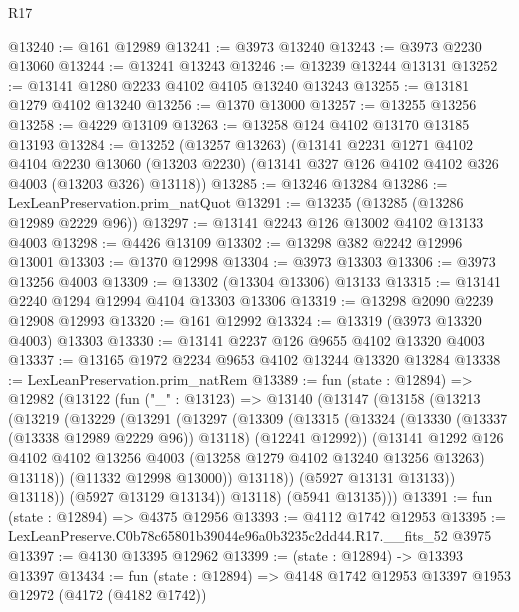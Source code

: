 \begin{lexlean}{R17}
\begin{coremodule}
@13240 := @161 @12989
@13241 := @3973 @13240
@13243 := @3973 @2230 @13060
@13244 := @13241 @13243
@13246 := @13239 @13244 @13131
@13252 := @13141 @1280 @2233 @4102 @4105 @13240 @13243
@13255 := @13181 @1279 @4102 @13240
@13256 := @1370 @13000
@13257 := @13255 @13256
@13258 := @4229 @13109
@13263 := @13258 @124 @4102 @13170 @13185 @13193
@13284 := @13252
    (@13257 @13263)
    (@13141
      @2231
      @1271
      @4102
      @4104
      @2230
      @13060
      (@13203 @2230)
      (@13141 @327 @126 @4102 @4102 @326 @4003 (@13203 @326) @13118))
@13285 := @13246 @13284
@13286 := LexLeanPreservation.prim_natQuot
@13291 := @13235 (@13285 (@13286 @12989 @2229 @96))
@13297 := @13141 @2243 @126 @13002 @4102 @13133 @4003
@13298 := @4426 @13109
@13302 := @13298 @382 @2242 @12996 @13001
@13303 := @1370 @12998
@13304 := @3973 @13303
@13306 := @3973 @13256 @4003
@13309 := @13302 (@13304 @13306) @13133
@13315 := @13141 @2240 @1294 @12994 @4104 @13303 @13306
@13319 := @13298 @2090 @2239 @12908 @12993
@13320 := @161 @12992
@13324 := @13319 (@3973 @13320 @4003) @13303
@13330 := @13141 @2237 @126 @9655 @4102 @13320 @4003
@13337 := @13165 @1972 @2234 @9653 @4102 @13244 @13320 @13284
@13338 := LexLeanPreservation.prim_natRem
@13389 := fun (state : @12894) =>
  @12982
    (@13122
      (fun ("_" : @13123) =>
      @13140
        (@13147
          (@13158
            (@13213
              (@13219
                (@13229
                  (@13291
                    (@13297
                      (@13309
                        (@13315
                          (@13324
                            (@13330 (@13337 (@13338 @12989 @2229 @96)) @13118)
                            (@12241 @12992))
                          (@13141
                            @1292
                            @126
                            @4102
                            @4102
                            @13256
                            @4003
                            (@13258 @1279 @4102 @13240 @13256 @13263)
                            @13118))
                        (@11332 @12998 @13000))
                      @13118))
                  (@5927 @13131 @13133))
                @13118))
            (@5927 @13129 @13134))
          @13118)
        (@5941 @13135)))
@13391 := fun (state : @12894) => @4375 @12956
@13393 := @4112 @1742 @12953
@13395 := LexLeanPreserve.C0b78c65801b39044e96a0b3235c2dd44.R17.__fits_52 @3975
@13397 := @4130 @13395 @12962
@13399 := (state : @12894) -> @13393 @13397
@13434 := fun (state : @12894) =>
  @4148
    @1742
    @12953
    @13397
    @1953
    @12972
    (@4172 (@4182 @1742))

\end{coremodule}
\end{lexlean}
